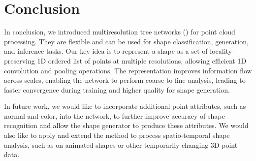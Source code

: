 \section{Conclusion}

In conclusion, we introduced multiresolution tree networks (\mrtnet) for point cloud processing. They are flexible and can be used for shape classification, generation, and inference tasks. Our key idea is to represent a shape as a set of locality-preserving 1D ordered list of points at multiple resolutions, allowing efficient 1D convolution and pooling operations. 
The representation improves information flow across scales, enabling the network to perform coarse-to-fine analysis, leading to faster convergence during training
and higher quality for shape generation. 

In future work, we would like to incorporate additional point attributes, such as normal and color, into the network, 
to further improve accuracy of shape recognition and allow the shape generator to produce these attributes. 
We would also like to apply 
and extend the method to process spatio-temporal shape analysis, such as on animated shapes or other temporarlly changing 3D point data.
